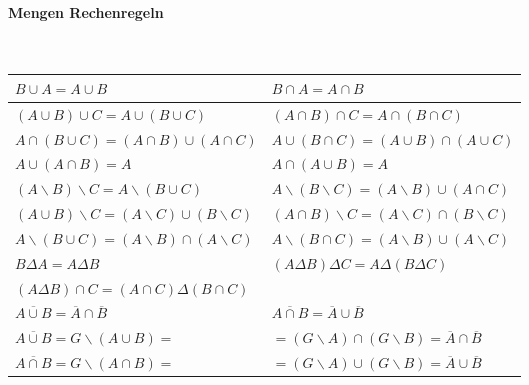 \paragraph{Mengen Rechenregeln}\mbox{}\\
\begin{tabularx}{\columnwidth}{@{}X|X@{}}
    \hline
    $B\cup A = A\cup B$                                              & $B\cap A = A \cap B$                                                      \\ \hline
    $(A\cup B)\cup C = A\cup (B\cup C)$                              & $(A\cap B)\cap C = A\cap (B\cap C)$                                       \\ \hline
    $A\cap (B\cup C) = (A\cap B)\cup (A\cap C)$                      & $A\cup (B\cap C) = (A\cup B)\cap (A\cup C)$                               \\ \hline
    $A\cup (A\cap B) = A$                                            & $A\cap (A\cup B) = A$                                                     \\ \hline
    $(A\backslash B)\backslash C = A \backslash (B\cup C)$           & $A\backslash (B\backslash C) = (A \backslash B)\cup (A\cap C)$            \\ \hline
    $(A\cup B) \backslash C = (A \backslash C) \cup (B\backslash C)$ & $(A\cap B) \backslash C = (A \backslash C) \cap (B \backslash C)$         \\ \hline
    $A\backslash (B\cup C) = (A \backslash B)\cap (A \backslash C)$  & $ A\backslash(B\cap C) = (A\backslash B) \cup (A \backslash C) $          \\ \hline
    $B\Delta A = A\Delta B$                                          & $(A\Delta B)\Delta C = A\Delta (B\Delta C)$                               \\ \hline
    $(A\Delta B)\cap C = (A\cap C)\Delta (B\cap C)$                  &                                                                           \\ \hline
    $\overline{A\cup B} = \overline{A}\cap \overline{B}$             & $\overline{A\cap B} = \overline{A}\cup \overline{B}$                      \\ \hline
    $\overline{A\cup B} = G\backslash (A\cup B) =$                   & $ = (G\backslash A) \cap (G\backslash B) = \overline{A}\cap \overline{B}$ \\ \hline
    $\overline{A\cap B} = G\backslash (A\cap B) =$                   & $ = (G\backslash A) \cup (G\backslash B) = \overline{A}\cup \overline{B}$ \\ \hline
\end{tabularx}
\vspace{1mm}

